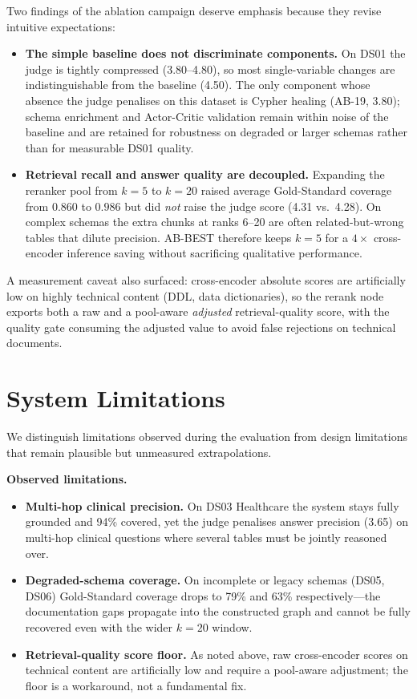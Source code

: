 Two findings of the ablation campaign deserve emphasis because they revise intuitive expectations:
\begin{itemize}
    \item \textbf{The simple baseline does not discriminate components.} On DS01 the judge is tightly compressed (3.80--4.80), so most single-variable changes are indistinguishable from the baseline (4.50). The only component whose absence the judge penalises on this dataset is Cypher healing (AB-19, 3.80); schema enrichment and Actor-Critic validation remain within noise of the baseline and are retained for robustness on degraded or larger schemas rather than for measurable DS01 quality.
    \item \textbf{Retrieval recall and answer quality are decoupled.} Expanding the reranker pool from $k{=}5$ to $k{=}20$ raised average Gold-Standard coverage from $0.860$ to $0.986$ but did \emph{not} raise the judge score (4.31 vs.\ 4.28). On complex schemas the extra chunks at ranks 6--20 are often related-but-wrong tables that dilute precision. AB-BEST therefore keeps $k{=}5$ for a $4\times$ cross-encoder inference saving without sacrificing qualitative performance.
\end{itemize}
A measurement caveat also surfaced: cross-encoder absolute scores are artificially low on highly technical content (DDL, data dictionaries), so the rerank node exports both a raw and a pool-aware \emph{adjusted} retrieval-quality score, with the quality gate consuming the adjusted value to avoid false rejections on technical documents.

\section{System Limitations}
\label{sec:conclusion:limitations}

We distinguish limitations observed during the evaluation from design limitations that remain plausible but unmeasured extrapolations.

\textbf{Observed limitations.}
\begin{itemize}
    \item \textbf{Multi-hop clinical precision.} On DS03 Healthcare the system stays fully grounded and 94\% covered, yet the judge penalises answer precision (3.65) on multi-hop clinical questions where several tables must be jointly reasoned over.
    \item \textbf{Degraded-schema coverage.} On incomplete or legacy schemas (DS05, DS06) Gold-Standard coverage drops to 79\% and 63\% respectively---the documentation gaps propagate into the constructed graph and cannot be fully recovered even with the wider $k{=}20$ window.
    \item \textbf{Retrieval-quality score floor.} As noted above, raw cross-encoder scores on technical content are artificially low and require a pool-aware adjustment; the floor is a workaround, not a fundamental fix.
\end{itemize}

